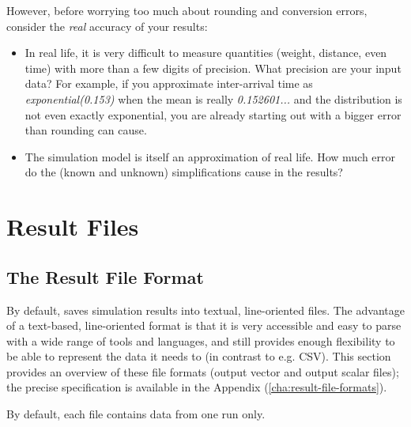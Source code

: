 However, before worrying too much about rounding and conversion errors,
consider the \textit{real} accuracy of your results:

\begin{itemize}
  \item In real life, it is very difficult to measure quantities (weight, distance,
     even time) with more than a few digits of precision. What precision
     are your input data? For example, if you approximate inter-arrival
     time as \textit{exponential(0.153)} when the mean is really
     \textit{0.152601...} and the distribution is not even exactly exponential,
     you are already starting out with a bigger error than rounding can cause.

  \item The simulation model is itself an approximation of real life. How much
     error do the (known and unknown) simplifications cause in the results?
\end{itemize}



\section{Result Files}
\label{sec:ana-sim:result-files}

\subsection{The {\opp} Result File Format}
\label{sec:ana-sim:omnetpp-result-file-format}

By default, {\opp} saves simulation results into textual, line-oriented files.
The advantage of a text-based, line-oriented format is that it is very
accessible and easy to parse with a wide range of tools and languages, and
still provides enough flexibility to be able to represent the data it
needs to (in contrast to e.g. CSV). This section provides an overview of
these file formats (output vector and output scalar files); the precise
specification is available in the Appendix (\ref{cha:result-file-formats}).


By default, each file contains data from one run only.

